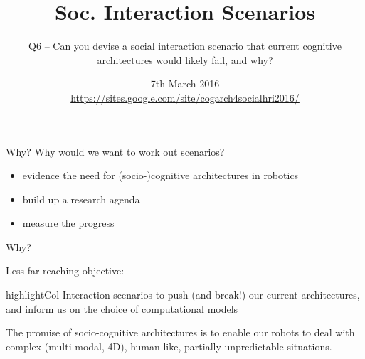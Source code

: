 \documentclass[compress]{beamer}
\title{Soc. Interaction Scenarios}
\subtitle{Q6 -- Can you devise a social interaction scenario that current
cognitive architectures would likely fail, and why?}
\date{7th March 2016\\ {\tiny \url{https://sites.google.com/site/cogarch4socialhri2016/}}}
\author{}
\institute{\texttt{[image: plymouth-logo]}}
\newcommand{\highlight}[1]{%
    \begin{beamercolorbox}[wd=\linewidth,dp=0.7ex]{highlightCol}%
    #1%
    \end{beamercolorbox}%
}%
\begin{document}
\maketitle

\begin{frame}{Why?}
    Why would we want to work out scenarios?

    \begin{itemize}
        \item {\Medium evidence the need} for (socio-)cognitive architectures in
            robotics
        \item {\Medium build up a research agenda}
        \item {\Medium measure the progress}
    \end{itemize}


\end{frame}

\begin{frame}{Why?}

    Less far-reaching objective:
    \vspace{1em}

    \highlight{\centering Interaction scenarios to {\Medium push (and break!)
    our current architectures}, and {\Medium inform} us on the choice of computational models}

\end{frame}

\begin{frame}{}

    The promise of socio-cognitive architectures is to enable our
    robots to {\Medium deal with complex (multi-modal, 4D), human-like, partially unpredictable
    situations}.

    \vspace{2em}


\end{frame}
\end{document}
